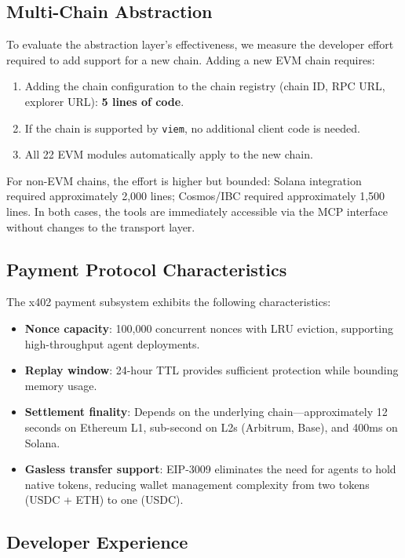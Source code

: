 \documentclass[11pt]{article}
\begin{document}
\subsection{Multi-Chain Abstraction}

To evaluate the abstraction layer's effectiveness, we measure the developer effort required to add support for a new chain. Adding a new EVM chain requires:
\begin{enumerate}[leftmargin=*]
  \item Adding the chain configuration to the chain registry (chain ID, RPC URL, explorer URL): \textbf{5 lines of code}.
  \item If the chain is supported by \texttt{viem}, no additional client code is needed.
  \item All 22 EVM modules automatically apply to the new chain.
\end{enumerate}

For non-EVM chains, the effort is higher but bounded: Solana integration required approximately 2,000 lines; Cosmos/IBC required approximately 1,500 lines. In both cases, the tools are immediately accessible via the MCP interface without changes to the transport layer.

\subsection{Payment Protocol Characteristics}

The x402 payment subsystem exhibits the following characteristics:
\begin{itemize}[leftmargin=*]
  \item \textbf{Nonce capacity}: 100,000 concurrent nonces with LRU eviction, supporting high-throughput agent deployments.
  \item \textbf{Replay window}: 24-hour TTL provides sufficient protection while bounding memory usage.
  \item \textbf{Settlement finality}: Depends on the underlying chain---approximately 12 seconds on Ethereum L1, sub-second on L2s (Arbitrum, Base), and 400ms on Solana.
  \item \textbf{Gasless transfer support}: EIP-3009 eliminates the need for agents to hold native tokens, reducing wallet management complexity from two tokens (USDC + ETH) to one (USDC).
\end{itemize}

\subsection{Developer Experience}
\end{document}
